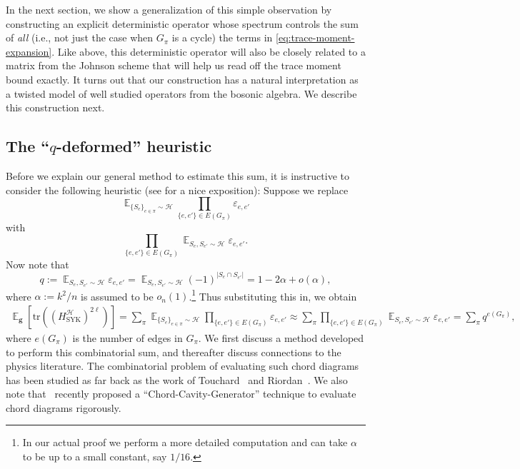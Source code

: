 \documentclass
[11pt,letterpaper]
{article}
\theoremstyle{definition}
\newcommand{\eps}{\varepsilon}
\newcommand{\1}{\mathbf{1}}
\newcommand{\tr}{\mathrm{tr}}
\newcommand{\cH}{\mathcal H}
\DeclareMathOperator*{\E}{\mathbb{E}}
\begin{document}
In the next section, we show a generalization of this simple observation by constructing an explicit deterministic operator whose spectrum controls the sum of \emph{all} (i.e., not just the case when $G_{\pi}$ is a cycle) the terms in \eqref{eq:trace-moment-expansion}. Like above, this deterministic operator will also be closely related to a matrix from the Johnson scheme that will help us read off the trace moment bound exactly. It turns out that our construction has a natural interpretation as a twisted model of well studied operators from the bosonic algebra. We describe this construction next. 

% 


\subsection{The ``$q$-deformed'' heuristic} Before we explain our general method to estimate this sum, it is instructive to consider the following heuristic (see \cite{hastings2022optimizing} for a nice exposition): Suppose we replace 
\[\E_{\{S_e\}_{e\in\pi}\sim\cH}\prod_{\{e, e'\}\in E(G_\pi)}\eps_{e, e'}\] 
with 
\[\prod_{\{e, e'\}\in E(G_\pi)}\E_{S_e, S_{e'}\sim\cH}\eps_{e, e'}.\]
Now note that 
\[q:= \E_{S_e, S_{e'}\sim\cH}\eps_{e, e'} = \E_{S_e, S_{e'}\sim\cH}(-1)^{|S_e\cap S_{e'}|} = 1 - 2\alpha + o(\alpha),\] 
where $\alpha:= k^2/n$ is assumed to be $o_n(1)$.\footnote{In our actual proof we perform a more detailed computation and can take $\alpha$ to be up to a small constant, say $1/16$.} Thus substituting this in, we obtain 
\begin{align}\label{eq:trace-method-heuristic}
    \E_{\bm g}\left[\tr((H^\cH_{\operatorname{SYK}})^{2\ell})\right] = \sum_\pi\E_{\{S_e\}_{e\in\pi}\sim\cH}\prod_{\{e, e'\}\in E(G_\pi)}\eps_{e, e'}\approx \sum_\pi\prod_{\{e, e'\}\in E(G_\pi)}\E_{S_e, S_{e'}\sim\cH}\eps_{e, e'} = \sum_\pi q^{e(G_\pi)},
\end{align}
where $e(G_\pi)$ is the number of edges in $G_\pi$. We first discuss a method developed to perform this combinatorial sum, and thereafter discuss connections to the physics literature. The combinatorial problem of evaluating such chord diagrams has been studied as far back as the work of Touchard~\cite{touchard1952probleme} and Riordan~\cite{riordan1975distribution}. We also note that~\cite{gamarnik2026free} recently proposed a ``Chord-Cavity-Generator'' technique to evaluate chord diagrams rigorously. 
\end{document}
